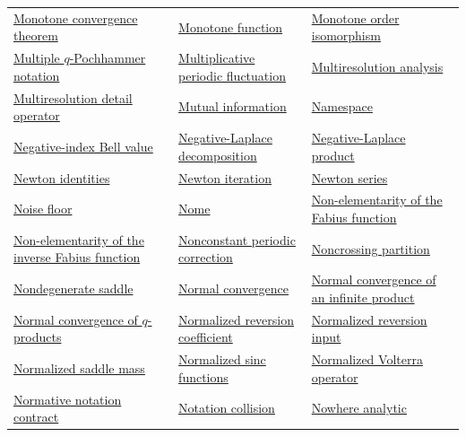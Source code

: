 \documentclass[11pt,oneside]{article}
\begin{document}
\begin{longtable}{L{0.31\textwidth}L{0.31\textwidth}L{0.31\textwidth}}
\hyperlink{gls:monotone-convergence-theorem}{Monotone convergence theorem} & \hyperlink{gls:monotone-function}{Monotone function} & \hyperlink{gls:monotone-order-isomorphism}{Monotone order isomorphism} \\
\hyperlink{gls:q-multifactorial-product}{Multiple \(q\)-Pochhammer notation} & \hyperlink{gls:multiplicative-periodic-fluctuation}{Multiplicative periodic fluctuation} & \hyperlink{gls:multiresolution-analysis}{Multiresolution analysis} \\
\hyperlink{gls:multiresolution-detail-operator}{Multiresolution detail operator} & \hyperlink{gls:mutual-information}{Mutual information} & \hyperlink{gls:namespace}{Namespace} \\
\hyperlink{gls:negative-index-bell-value}{Negative-index Bell value} & \hyperlink{gls:negative-laplace-decomposition}{Negative-Laplace decomposition} & \hyperlink{gls:negative-laplace-product}{Negative-Laplace product} \\
\hyperlink{gls:newton-identities}{Newton identities} & \hyperlink{gls:newton-iteration}{Newton iteration} & \hyperlink{gls:newton-series}{Newton series} \\
\hyperlink{gls:noise-floor}{Noise floor} & \hyperlink{gls:nome}{Nome} & \hyperlink{gls:fabius-non-elementarity}{Non-elementarity of the Fabius function} \\
\hyperlink{gls:inverse-fabius-non-elementarity}{Non-elementarity of the inverse Fabius function} & \hyperlink{gls:nonconstant-periodic-correction}{Nonconstant periodic correction} & \hyperlink{gls:noncrossing-partition}{Noncrossing partition} \\
\hyperlink{gls:nondegenerate-saddle}{Nondegenerate saddle} & \hyperlink{gls:normal-convergence}{Normal convergence} & \hyperlink{gls:normal-convergence-of-product}{Normal convergence of an infinite product} \\
\hyperlink{gls:q-pochhammer-normal-convergence}{Normal convergence of \(q\)-products} & \hyperlink{gls:normalized-reversion-coefficient}{Normalized reversion coefficient} & \hyperlink{gls:normalized-reversion-input}{Normalized reversion input} \\
\hyperlink{gls:normalized-saddle-mass}{Normalized saddle mass} & \hyperlink{gls:normalized-sinc-functions}{Normalized sinc functions} & \hyperlink{gls:normalized-volterra-operator}{Normalized Volterra operator} \\
\hyperlink{gls:normative-notation-contract}{Normative notation contract} & \hyperlink{gls:notation-collision}{Notation collision} & \hyperlink{gls:nowhere-analytic}{Nowhere analytic} \\

\end{longtable}
\end{document}
